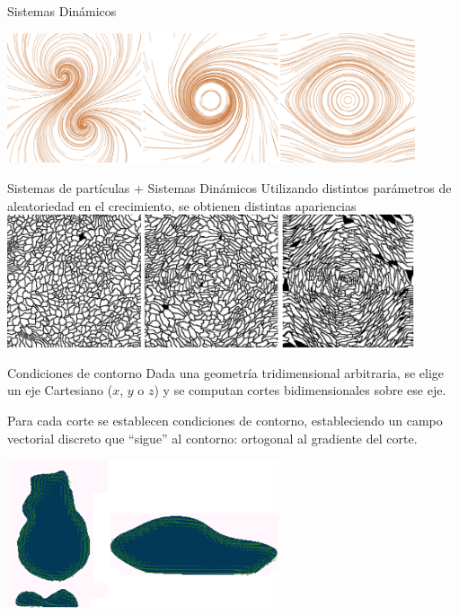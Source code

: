 \documentclass[spanish]{beamer}
\begin{document}
\begin{frame}{Sistemas Dinámicos}
  \centerline{\includegraphics[width=12cm]{../figures/Fig2}}
\end{frame}

\begin{frame}{Sistemas de partículas + Sistemas Dinámicos}
Utilizando distintos parámetros de aleatoriedad en el crecimiento, se obtienen distintas apariencias
  \includegraphics[width=12cm]{../figures/Fig3}
\end{frame}

\begin{frame}{Condiciones de contorno}
Dada una geometría tridimensional arbitraria, se elige un eje Cartesiano ($x$, $y$ o $z$) y se computan cortes bidimensionales sobre ese eje.

Para cada corte se establecen condiciones de contorno, estableciendo un campo vectorial discreto que ``sigue'' al contorno: ortogonal al gradiente del corte.

  \centerline{\includegraphics[width=8cm]{../figures/Fig4}}
\end{frame}
\end{document}

